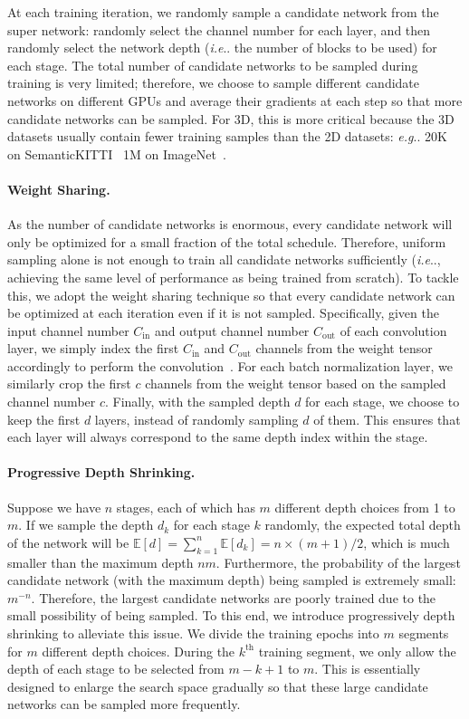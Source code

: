 \documentclass[runningheads]{llncs}
\makeatletter
\DeclareRobustCommand\onedot{\futurelet\@let@token\@onedot}
\def\@onedot{\ifx\@let@token.\else.\null\fi\xspace}
\def\eg{\emph{e.g}\onedot} \def\Eg{\emph{E.g}\onedot}
\def\ie{\emph{i.e}\onedot} \def\Ie{\emph{I.e}\onedot}
\makeatother
\begin{document}
At each training iteration, we randomly sample a candidate network from the super network: randomly select the channel number for each layer, and then randomly select the network depth (\ie the number of blocks to be used) for each stage. The total number of candidate networks to be sampled during training is very limited; therefore, we choose to sample different candidate networks on different GPUs and average their gradients at each step so that more candidate networks can be sampled. For 3D, this is more critical because the 3D datasets usually contain fewer training samples than the 2D datasets: \eg 20K on SemanticKITTI~\cite{behley2019semantickitti} \vs 1M on ImageNet~\cite{deng2009imagenet}.

\paragraph{Weight Sharing.}

As the number of candidate networks is enormous, every candidate network will only be optimized for a small fraction of the total schedule. Therefore, uniform sampling alone is not enough to train all candidate networks sufficiently (\ie, achieving the same level of performance as being trained from scratch). To tackle this, we adopt the weight sharing technique so that every candidate network can be optimized at each iteration even if it is not sampled. Specifically, given the input channel number $C_{\text{in}}$ and output channel number $C_{\text{out}}$ of each convolution layer, we simply index the first $C_{\text{in}}$ and $C_{\text{out}}$ channels from the weight tensor accordingly to perform the convolution~\cite{guo2019single}. For each batch normalization layer, we similarly crop the first $c$ channels from the weight tensor based on the sampled channel number $c$. Finally, with the sampled depth $d$ for each stage, we choose to keep the first $d$ layers, instead of randomly sampling $d$ of them. This ensures that each layer will always correspond to the same depth index within the stage.

\paragraph{Progressive Depth Shrinking.}

Suppose we have $n$ stages, each of which has $m$ different depth choices from 1 to $m$. If we sample the depth $d_k$ for each stage $k$ randomly, the expected total depth of the network will be
$\mathbb{E}[d] = \sum_{k=1}^n \mathbb{E}[d_k] = n\times(m+1)/2$,
which is much smaller than the maximum depth $nm$. Furthermore, the probability of the largest candidate network (with the maximum depth) being sampled is extremely small: $m^{-n}$. Therefore, the largest candidate networks are poorly trained due to the small possibility of being sampled. To this end, we introduce progressively depth shrinking to alleviate this issue. We divide the training epochs into $m$ segments for $m$ different depth choices. During the $k^{\text{th}}$ training segment, we only allow the depth of each stage to be selected from $m-k+1$ to $m$. This is essentially designed to enlarge the search space gradually so that these large candidate networks can be sampled more frequently.
\end{document}

